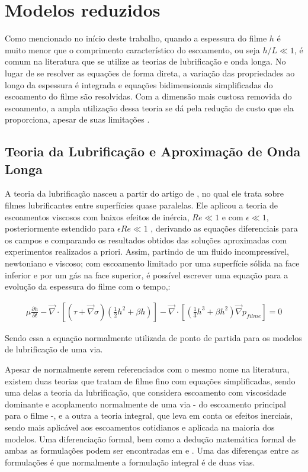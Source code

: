 \section{Modelos reduzidos}

Como mencionado no início deste trabalho, quando a espessura do filme $h$ é muito menor que o comprimento característico do escoamento, ou seja $h/L \ll 1$, é comum na literatura que se utilize as teorias de lubrificação e onda longa. No lugar de se resolver as equações de forma direta, a variação das propriedades ao longo da espessura é integrada e equações bidimensionais simplificadas do escoamento do filme são resolvidas. Com a dimensão mais custosa removida do escoamento, a ampla utilização dessa teoria se dá pela redução de custo que ela proporciona, apesar de suas limitações \citep{Oron1997,Craster2009}.

\subsection{Teoria da Lubrificação e Aproximação de Onda Longa}

A teoria da lubrificação nasceu a partir do artigo de \citet{Reynolds1886}, no qual ele trata sobre filmes lubrificantes entre superfícies quase paralelas. Ele aplicou a teoria de escoamentos viscosos com baixos efeitos de inércia, $Re \ll 1$ e com $\epsilon \ll 1$, posteriormente estendido para $\epsilon Re \ll 1$ \citep{Craster2009},  derivando as equações diferenciais para os campos e comparando os resultados obtidos das soluções aproximadas com experimentos realizados a priori. Assim, partindo de um fluido incompressível, newtoniano e viscoso; com escoamento limitado por uma superfície sólida na face inferior e por um gás na face superior, é possível escrever uma equação para a evolução da espessura do filme com o tempo,\citep{Oron1997}:

\begin{align}
    \mu \frac{\partial h}{\partial t} - \vec{\nabla} \cdot \left[\left(\tau + \vec{\nabla} \sigma\right) \left( \frac{1}{2}h^2 + \beta h\right)\right]  - \vec{\nabla} \cdot \left[\left(\frac{1}{3}h^3 + \beta h^2\right) \vec{\nabla}p_{filme}\right]= 0  \label{eq:oron_tangente}
\end{align}

Sendo essa a equação normalmente utilizada de ponto de partida para os modelos de lubrificação de uma via.

Apesar de normalmente serem referenciados com o mesmo nome na literatura, existem duas teorias que tratam de filme fino com equações simplificadas, sendo uma delas a teoria da lubrificação, que considera escoamento com viscosidade dominante e acoplamento normalmente de uma via - do escoamento principal para o filme -, e a outra a teoria integral, que leva em conta os efeitos inerciais, sendo mais aplicável aos escoamentos cotidianos e aplicada na maioria dos modelos. Uma diferenciação formal, bem como a dedução matemática formal de ambas as formulações podem ser encontradas em \citet{Obrien2002} e \citet{Craster2009}. Uma das diferenças entre as formulações é que normalmente a formulação integral é de duas vias.


